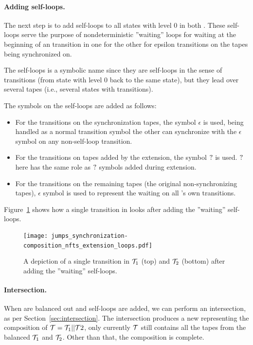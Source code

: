 \paragraph{Adding self-loops.}
The next step is to add self-loops to all states with level $0$ in both \nfts.
These self-loops serve the purpose of nondeterministic ''waiting'' loops for waiting at the beginning of an \nft transition in one \nft for the other \nft for epsilon transitions on the tapes being synchronized on.

The self-loops is a symbolic name since they are self-loops in the sense of \nft transitions (from state with level $0$ back to the same state), but they lead over several tapes (i.e., several states with transitions).

The symbols on the self-loops are added as follows:
\begin{itemize}
  \item For the transitions on the synchronization tapes, the symbol $\epsilon$ is used, being handled as a normal transition symbol the other \nft can synchronize with the $\epsilon$ symbol on any non-self-loop transition.
  \item For the transitions on tapes added by the extension, the symbol $?$ is used.
  $?$ here has the same role as $?$ symbols added during extension.
  \item For the transitions on the remaining tapes (the original non-synchronizing tapes), $\epsilon$ symbol is used to represent the waiting on all \nft's own transitions.
\end{itemize}

\begin{example}
  Figure~\ref{fig:composition_nfts_extension_loops} shows how a single transition in \nfts looks after adding the ''waiting'' self-loops.
  \begin{figure}[ht]
    \centering
    \texttt{[image: jumps\_synchronization-composition\_nfts\_extension\_loops.pdf]}
    \caption{
      A depiction of a single transition in \nfts $\mathcal{T}_1$ (top) and $\mathcal{T}_2$ (bottom) after adding the ''waiting'' self-loops.
    }
    \label{fig:composition_nfts_extension_loops}
  \end{figure}
\end{example}

\paragraph{Intersection.}
When \nfts are balanced out and self-loops are added, we can perform an \nft intersection, as per Section~\ref{sec:intersection}.
The intersection produces a new \nft representing the composition of $\mathcal{T} = \mathcal{T}_1 || \mathcal{T}2$, only currently $\mathcal{T}$ still contains all the tapes from the balanced $\mathcal{T}_1$ and $\mathcal{T}_2$.
Other than that, the composition is complete.

